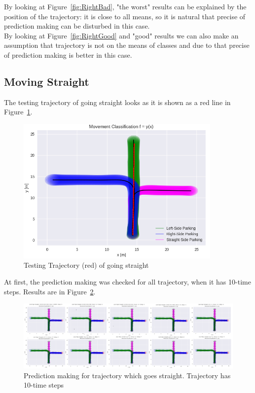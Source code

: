By looking at Figure~\ref{fig:RightBad}, "the worst" results can be explained by the position of the trajectory: it is close to all means, so it is natural that precise of prediction making can be disturbed in this case. \\
By looking at Figure~\ref{fig:RightGood} and "good" results we can also make an assumption that trajectory is not on the means of classes and due to that precise of prediction making is better in this case. 

\subsection{Moving Straight}

The testing trajectory of going straight looks as it is shown as a red line in Figure~\ref{fig:straight}.

\begin{figure}[h]
	\centering  	
	\includegraphics[width=10cm]{img/straight_org.jpg}
	\caption{Testing Trajectory (red) of going straight}
	\label{fig:straight}    
\end{figure}

At first, the prediction making was checked for all trajectory, when it has 10-time steps. Results are in Figure~\ref{fig:straightPrediction}. 

\begin{figure}[h]
	\centering  	
	\includegraphics[width=18cm]{img/0_prediction_straight.PNG}
	\caption{Prediction making for trajectory which goes straight. Trajectory has 10-time steps}
	\label{fig:straightPrediction}    
\end{figure}


